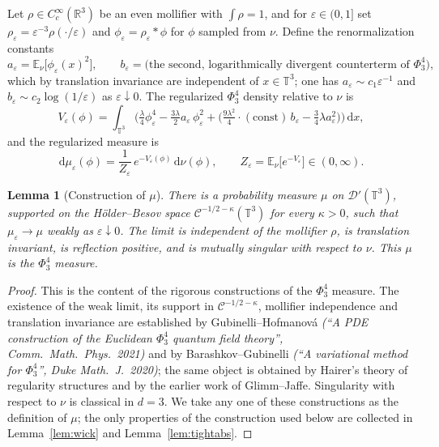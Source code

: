 \documentclass[12pt]{article}
\newtheorem{lemma}{Lemma}
\theoremstyle{definition}
\newcommand{\T}{\mathbb{T}^3}
\newcommand{\R}{\mathbb{R}}
\newcommand{\E}{\mathbb{E}}
\newcommand{\dd}{\mathrm{d}}
\begin{document}
Let $\rho\in C_c^\infty(\R^3)$ be an even mollifier with $\int\rho=1$, and for
$\varepsilon\in(0,1]$ set $\rho_\varepsilon=\varepsilon^{-3}\rho(\cdot/\varepsilon)$ and
$\phi_\varepsilon=\rho_\varepsilon*\phi$ for $\phi$ sampled from $\nu$. Define the
renormalization constants
\begin{equation}\label{eq:cterms}
  a_\varepsilon=\E_\nu\big[\phi_\varepsilon(x)^2\big],\qquad
  b_\varepsilon=\text{(the second, logarithmically divergent counterterm of }\Phi^4_3),
\end{equation}
which by translation invariance are independent of $x\in\T$; one has
$a_\varepsilon\sim c_1\varepsilon^{-1}$ and $b_\varepsilon\sim c_2\log(1/\varepsilon)$ as
$\varepsilon\downarrow0$. The regularized $\Phi^4_3$ density relative to $\nu$ is
\begin{equation}\label{eq:Veps}
  V_\varepsilon(\phi)
  =\int_{\T}\Big(\tfrac{\lambda}{4}\phi_\varepsilon^4
     -\tfrac{3\lambda}{2}a_\varepsilon\,\phi_\varepsilon^2
     +\big(\tfrac{9\lambda^2}{4}\!\cdot\!(\text{const})\,b_\varepsilon-\tfrac34\lambda a_\varepsilon^2\big)\Big)\,\dd x ,
\end{equation}
and the regularized measure is
\begin{equation}\label{eq:mueps}
  \dd\mu_\varepsilon(\phi)=\frac{1}{Z_\varepsilon}\,e^{-V_\varepsilon(\phi)}\,\dd\nu(\phi),
  \qquad Z_\varepsilon=\E_\nu\big[e^{-V_\varepsilon}\big]\in(0,\infty).
\end{equation}

\begin{lemma}[Construction of $\mu$]\label{lem:construction}
There is a probability measure $\mu$ on $\mathcal D'(\T)$, supported on the
H\"older--Besov space $\mathcal C^{-1/2-\kappa}(\T)$ for every $\kappa>0$, such that
$\mu_\varepsilon\to\mu$ weakly as $\varepsilon\downarrow0$. The limit is independent of
the mollifier $\rho$, is translation invariant, is reflection positive, and is
mutually singular with respect to $\nu$. This $\mu$ is the $\Phi^4_3$ measure.
\end{lemma}

\begin{proof}
This is the content of the rigorous constructions of the $\Phi^4_3$ measure. The
existence of the weak limit, its support in $\mathcal C^{-1/2-\kappa}$, mollifier
independence and translation invariance are established by Gubinelli--Hofmanov\'a
\emph{(``A PDE construction of the Euclidean $\Phi^4_3$ quantum field theory'',
Comm.\ Math.\ Phys.\ 2021)} and by Barashkov--Gubinelli \emph{(``A variational method for
$\Phi^4_3$'', Duke Math.\ J.\ 2020)}; the same object is obtained by Hairer's
theory of regularity structures and by the earlier work of Glimm--Jaffe. Singularity
with respect to $\nu$ is classical in $d=3$. We take any one of these constructions as
the definition of $\mu$; the only properties of the construction used below are
collected in Lemma~\ref{lem:wick} and Lemma~\ref{lem:tightabs}.
\end{proof}
\end{document}

